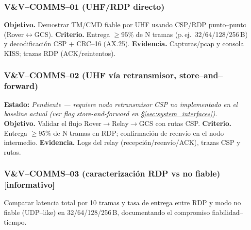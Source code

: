 \subsubsection*{V\&V--COMMS--01 (UHF/RDP directo)}
\textbf{Objetivo.} Demostrar TM/CMD fiable por UHF usando CSP/RDP punto--punto (Rover$\leftrightarrow$GCS).
\textbf{Criterio.} Entrega $\ge 95\%$ de N tramas (p.\,ej.\ 32/64/128/256\,B) y decodificación CSP + CRC--16 (AX.25).
\textbf{Evidencia.} Capturas/pcap y consola KISS; trazas RDP (ACK/reintentos).

\subsubsection*{V\&V--COMMS--02 (UHF vía retransmisor, store--and--forward)}
\textbf{Estado:} \emph{Pendiente --- requiere nodo retransmisor CSP no implementado en el baseline actual (ver flag store-and-forward en \S\ref{sec:system_interfaces}).}
\textbf{Objetivo.} Validar el flujo Rover$\rightarrow$Relay$\rightarrow$GCS con rutas CSP.
\textbf{Criterio.} Entrega $\ge 95\%$ de N tramas en RDP; confirmación de reenvío en el nodo intermedio.
\textbf{Evidencia.} Logs del relay (recepción/reenvío/ACK), trazas CSP y rutas.

\subsubsection*{V\&V--COMMS--03 (caracterización RDP vs no fiable) [informativo]}
Comparar latencia total por 10 tramas y tasa de entrega entre RDP y modo no fiable (UDP--like) en
32/64/128/256\,B, documentando el compromiso fiabilidad--tiempo.



